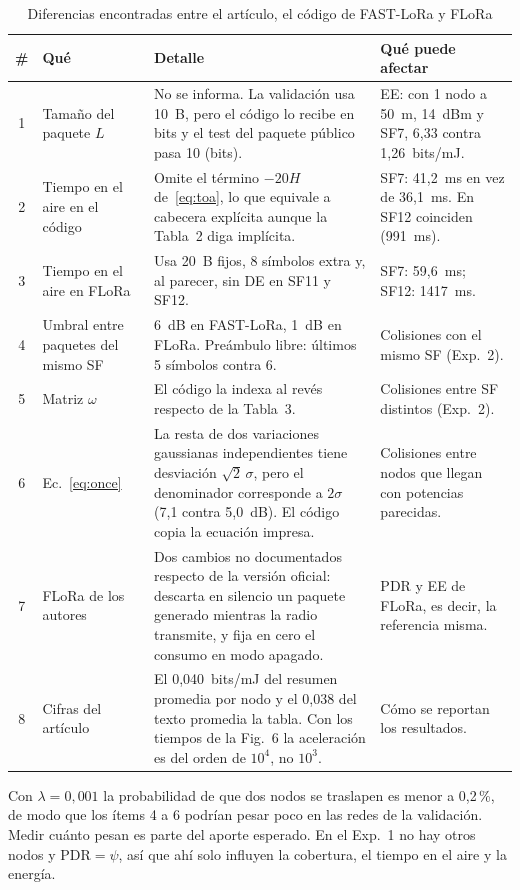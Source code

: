 \documentclass[conference,a4paper]{IEEEtran}
\begin{document}
\begin{table}[t]
\centering
\caption{Diferencias encontradas entre el artículo, el código de FAST-LoRa y FLoRa}
\label{tab:cabos}
\footnotesize
\renewcommand{\arraystretch}{1.15}
\begin{tabular}{@{}c p{4.6cm} p{6.2cm} p{5.0cm}@{}}
\toprule
\# & Qué & Detalle & Qué puede afectar \\ \midrule
1 & Tamaño del paquete $L$ & No se informa. La validación usa 10~B, pero el código lo recibe en bits y el test del paquete público pasa 10 (bits). & EE: con 1 nodo a 50~m, 14~dBm y SF7, 6,33 contra 1,26~bits/mJ. \\
2 & Tiempo en el aire en el código & Omite el término $-20H$ de~\eqref{eq:toa}, lo que equivale a cabecera explícita aunque la Tabla~2 diga implícita. & SF7: 41,2~ms en vez de 36,1~ms. En SF12 coinciden (991~ms). \\
3 & Tiempo en el aire en FLoRa & Usa 20~B fijos, 8 símbolos extra y, al parecer, sin DE en SF11 y SF12. & SF7: 59,6~ms; SF12: 1417~ms. \\
4 & Umbral entre paquetes del mismo SF & 6~dB en FAST-LoRa, 1~dB en FLoRa. Preámbulo libre: últimos 5 símbolos contra 6. & Colisiones con el mismo SF (Exp.~2). \\
5 & Matriz $\omega$ & El código la indexa al revés respecto de la Tabla~3. & Colisiones entre SF distintos (Exp.~2). \\
6 & Ec.~\eqref{eq:once} & La resta de dos variaciones gaussianas independientes tiene desviación $\sqrt2\,\sigma$, pero el denominador corresponde a $2\sigma$ (7,1 contra 5,0~dB). El código copia la ecuación impresa. & Colisiones entre nodos que llegan con potencias parecidas. \\
7 & FLoRa de los autores & Dos cambios no documentados respecto de la versión oficial: descarta en silencio un paquete generado mientras la radio transmite, y fija en cero el consumo en modo apagado. & PDR y EE de FLoRa, es decir, la referencia misma. \\
8 & Cifras del artículo & El 0,040~bits/mJ del resumen promedia por nodo y el 0,038 del texto promedia la tabla. Con los tiempos de la Fig.~6 la aceleración es del orden de $10^4$, no $10^3$. & Cómo se reportan los resultados. \\
\bottomrule
\end{tabular}
\end{table}

Con $\lambda=0{,}001$ la probabilidad de que dos nodos se traslapen es menor a 0,2\,\%, de modo que los ítems 4 a 6 podrían pesar poco en las redes de la validación. Medir cuánto pesan es parte del aporte esperado. En el Exp.~1 no hay otros nodos y $\mathrm{PDR}=\psi$, así que ahí solo influyen la cobertura, el tiempo en el aire y la energía.
\end{document}
